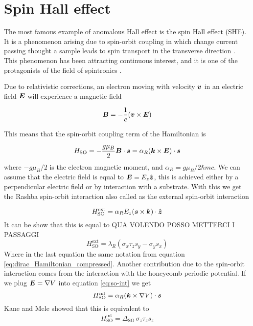 \section{Spin Hall effect}
The most famous example of anomalous Hall effect is the spin Hall effect (SHE). It is a phenomenon arising due to spin-orbit coupling in which change current passing thought a sample leads to spin transport in the transverse direction \cite{d1971spin}. This phenomenon has been attracting continuous interest, and it is one of the protagonists of the field of spintronics \cite{wolf2001spintronics}.


Due to relativistic corrections, an electron moving with velocity $\boldsymbol{v}$ in an electric field $\boldsymbol{E}$ will experience a magnetic field 

\begin{equation}
    \boldsymbol{B}=-\frac 1c(\boldsymbol{v} \times \boldsymbol{E})
\end{equation}

This means that the spin-orbit coupling term of the Hamiltonian is 

\begin{equation}
    H_\textrm{SO}=-\frac{g\mu_B}{2}\boldsymbol{B}\cdot\boldsymbol{s}=
    \alpha_R(\boldsymbol{k} \times \boldsymbol{E})\cdot \boldsymbol{s}
    \label{eq:so-int}
\end{equation}
where $-g\mu_B/2$ is the electron magnetic moment, and $\alpha_R=g\mu_B/2\hbar mc$. We can assume that the electric field is equal to $\boldsymbol{E}= E_z \hat{\boldsymbol{z}}$, this is achieved  either by a perpendicular electric field or by interaction with a substrate. With this we get the Rashba spin-orbit interaction also called as the external spin-orbit interaction\cite{bychkov1984properties}

\begin{equation}
    H_\textrm{SO}^\textrm{ext}=
    \alpha_R E_z(\boldsymbol{s} \times \boldsymbol{k})\cdot \hat{\boldsymbol{z}}
\end{equation}
It can be show that this is equal to \cite{kane2005quantum} QUA VOLENDO POSSO METTERCI I PASSAGGI
\begin{equation}
    H_\textrm{SO}^\textrm{ext}=
    \lambda_R (\sigma_x\tau_zs_y-\sigma_ys_x)
\end{equation}
Where in the last equation the same notation from equation \ref{eq:dirac_Hamiltonian_compressed}.
Another contribution due to the spin-orbit interaction comes from the interaction with the honeycomb periodic potential. If we plug $\boldsymbol{E}=\nabla V$ into equation \ref{eq:so-int} we get
\begin{equation}
    H_\textrm{SO}^\textrm{int}=\alpha_R(\boldsymbol{k}\times \nabla V)\cdot \boldsymbol{s}
\end{equation}
Kane and Mele \cite{kane2005quantum} showed that this is equivalent to 
\begin{equation}
    H_\textrm{SO}^\textrm{int}=\Delta_\textrm{SO}\,\sigma_z\tau_zs_z
\end{equation}